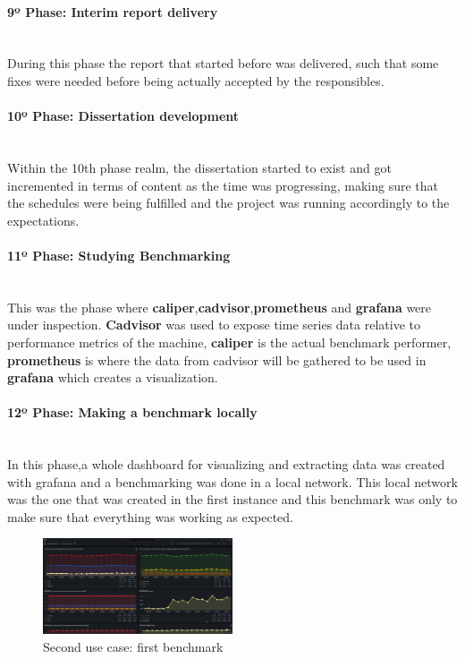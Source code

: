 \paragraph{9º Phase: Interim report delivery} \mbox{}\\
During this phase the report that started before was delivered, such that some fixes were needed before being actually accepted by the responsibles.

\paragraph{10º Phase: Dissertation development}\mbox{}\\
Within the 10th phase realm, the dissertation started to exist and got incremented in terms of content as the time was progressing, making sure that the schedules were being fulfilled and the project was running accordingly to the expectations.

\paragraph{11º Phase: Studying Benchmarking}\mbox{}\\
This was the phase where \textbf{caliper},\textbf{cadvisor},\textbf{prometheus} and \textbf{grafana} were under inspection. \textbf{Cadvisor} was used to expose time series data relative to performance metrics of the machine, \textbf{caliper} is the actual benchmark performer, \textbf{prometheus} is where the data from cadvisor will be gathered to be used in \textbf{grafana} which creates a visualization.

\paragraph{12º Phase: Making a benchmark locally}\mbox{}\\
In this phase,a whole dashboard for visualizing and extracting data was created with grafana and a benchmarking was done in a local network. This local network was the one that was created in the first instance and this benchmark was only to make sure that everything was working as expected.  

\begin{figure}[H]
    \centering
    \includegraphics[width=0.5\textwidth]{assets/use-case-2/first-benchmarking.png} %
    \caption{Second use case: first benchmark}
    \label{fig:sample-image} 
\end{figure}

